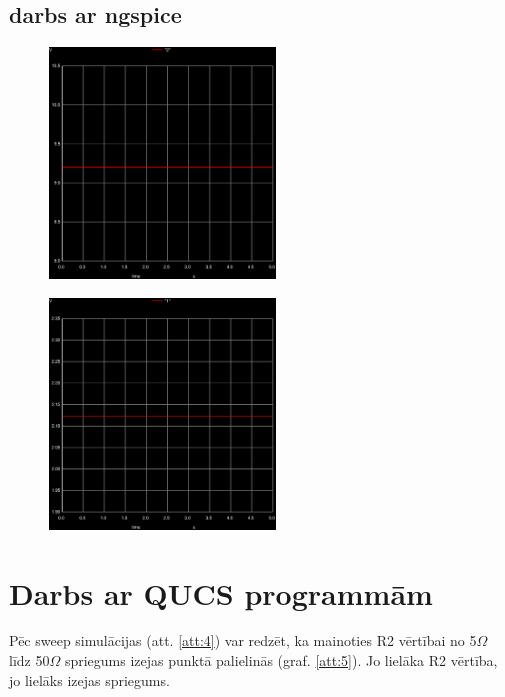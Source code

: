 \documentclass{report}
\begin{document}
\subsection{darbs ar ngspice}

\begin{figure}[b!]
\centering
\begin{minipage}{.5\textwidth}
\centering
\includegraphics[width=6cm]{012.ps}
\label{att:2}
\end{minipage}

\begin{minipage}{.5\textwidth}
\centering
\includegraphics[width=6cm]{011.ps}
\label{att:3}
\end{minipage}
\end{figure}

\newpage
\section{Darbs ar QUCS programmām}
Pēc sweep simulācijas (att. \ref{att:4}) var redzēt, ka mainoties R2 vērtībai no 5$ \Omega$ līdz 50$ \Omega$ spriegums izejas punktā palielinās (graf. \ref{att:5}). Jo lielāka R2 vērtība, jo lielāks izejas spriegums.
\end{document}
